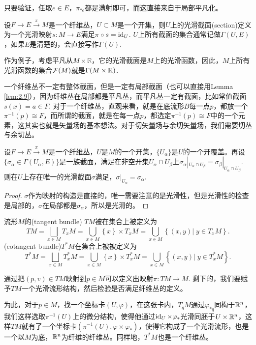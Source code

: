 只要验证，任取$e\in E$，$\pi_{*e}$都是满射即可，而这直接来自于局部平凡化。

\begin{para}[截面]
设$F\to E\xrightarrow{\pi} M$是一个纤维丛，$U\subset M$是一个开集，则$U$上的光滑截面(section)定义为一个光滑映射$s:M\to E$满足$\pi\circ s=\operatorname{id}_U$. $U$上所有截面的集合通常记做$\Gamma(U,E)$，如果$E$是清楚的，会直接写作$\Gamma(U)$. 
\end{para}

作为例子，考虑平凡从$M\times \mathbb{R}$，它的光滑截面是$M$上的光滑函数，因此，$M$上所有光滑函数的集合$\mathcal{F}(M)$就是$\Gamma(M\times \mathbb{R})$.

一个纤维丛不一定有整体截面，但是一定有局部截面（也可以直接用Lemma \ref{lem:2.9}），因为纤维丛在局部都是平凡丛，而平凡丛一定有截面，比如常值截面$s(x)=a\in F$. 对于一个纤维丛，直观来看，就是在底流形$B$每一点$p$，都放一个$\pi^{-1}(p)\cong F$，而所谓的截面，就是在每一点$p$，都选定$\pi^{-1}(p)\cong F$中的一个元素，这其实也就是矢量场的基本想法。对于切矢量场与余切矢量场，我们需要切丛与余切丛。

\begin{lem}[局部化原理]\label{localprin}
设$F\to E\xrightarrow{\pi} M$是一个纤维丛，$U$是$M$的一个开集，$\{U_\alpha\}$是$U$的一个开覆盖。再设$\{\sigma_\alpha\in \Gamma(U_\alpha,E)\}$是一族截面，满足在非空开集$U_\alpha\cap U_\beta$上$\sigma_\alpha|_{U_\alpha\cap U_\beta}=\sigma_\beta|_{U_\alpha\cap U_\beta}$. 则在$U$上存在唯一的光滑截面$\sigma$满足，$\sigma|_{U_\alpha}=\sigma_\alpha$.
\end{lem}

\begin{proof}
$\sigma$作为映射的构造是直接的，唯一需要注意的是光滑性，但是光滑性的检查是局部的，$\sigma$在局部都是$\sigma_\alpha$，所以是光滑的。
\end{proof}

\begin{para}[切丛与余切丛]
流形$M$的(tangent bundle) $TM$被在集合上被定义为
\[
	TM=\bigsqcup_{x\in M}T_xM=\bigcup_{x\in M} \left\{x\right\}\times T_xM=\bigcup_{x\in M} \left\{(x, y)\vert\; y\in T_xM\right\}.
\]
(cotangent bundle)$T^*M$在集合上被被定义为
\[
	T^*M=\bigsqcup_{x\in M}T^*_xM=\bigcup_{x\in M} \left\{x\right\}\times T^*_xM=\bigcup_{x\in M} \left\{(x, y)\vert\; y\in T_x^*M\right\}.
\]

通过把$(p,v)\in TM$映射到$p\in M$可以定义出映射$\pi: TM\to M$. 剩下的，我们要赋予$TM$一个光滑流形结构，然后检验是否满足纤维丛的定义。

为此，对于$p\in M$，找一个坐标卡$(U,\varphi)$，在这张卡内，$T_qM$通过$\varphi_{*q}$同构于$\mathbb{R}^n$，我们这样选取$\pi^{-1}(U)$上的微分结构，使得他通过$\operatorname{id}_U\times \varphi_*$光滑同胚于$U \times \mathbb{R}^n$，这样$TM$就有了一个坐标卡$(\pi^{-1}(U),\varphi\times \varphi_*)$，使得它构成了一个光滑流形，也是一个以$M$为底，$\mathbb{R}^n$为纤维的纤维丛。同样地，$T^*M$也是一个纤维丛。
\end{para}

